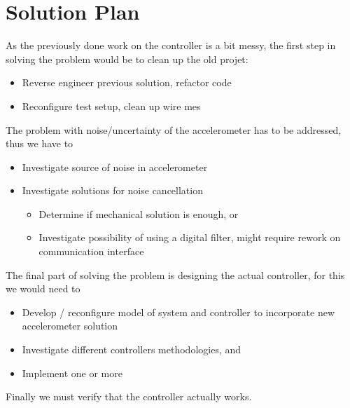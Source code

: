 \section*{Solution Plan}

As the previously done work on the controller is a bit messy, the first step in solving the problem would be to clean up the old projet:
\begin{itemize}
\item Reverse engineer previous solution, refactor code
\item Reconfigure test setup, clean up wire mes
\end{itemize}

The problem with noise/uncertainty of the accelerometer has to be addressed, thus we have to
\begin{itemize}
\item Investigate source of noise in accelerometer
\item Investigate solutions for noise cancellation
\begin{itemize}
	\item Determine if mechanical solution is enough, or
	\item Investigate possibility of using a digital filter, might require rework on communication interface
\end{itemize}
\end{itemize}

The final part of solving the problem is designing the actual controller, for this we would need to
\begin{itemize}
	\item Develop / reconfigure model of system and controller to incorporate new accelerometer solution
	\item Investigate different controllers methodologies, and
	\item Implement one or more
\end{itemize} 

Finally we must verify that the controller actually works.

